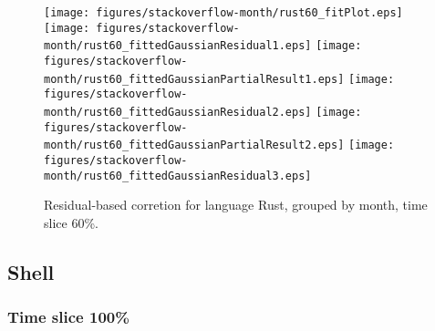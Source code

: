 \begin{figure}[hb]
\centering
{}
{\texttt{[image: figures/stackoverflow-month/rust60\_fitPlot.eps]}}
{\texttt{[image: figures/stackoverflow-month/rust60\_fittedGaussianResidual1.eps]}}
{\texttt{[image: figures/stackoverflow-month/rust60\_fittedGaussianPartialResult1.eps]}}
{\texttt{[image: figures/stackoverflow-month/rust60\_fittedGaussianResidual2.eps]}}
{\texttt{[image: figures/stackoverflow-month/rust60\_fittedGaussianPartialResult2.eps]}}
{\texttt{[image: figures/stackoverflow-month/rust60\_fittedGaussianResidual3.eps]}}
\caption{Residual-based corretion for language Rust, grouped by month, time slice 60\%.}
\end{figure}


\clearpage 
\newpage 


\subsection{Shell}

\FloatBarrier

\subsubsection{Time slice 100\%}

